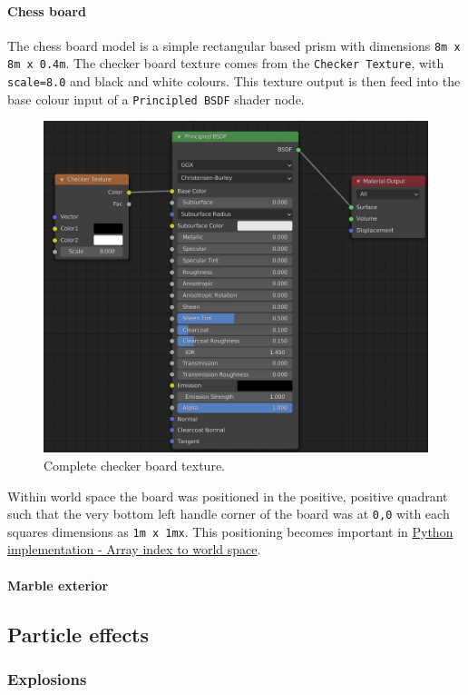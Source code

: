 \documentclass[11pt]{article}
\begin{document}
\paragraph{Chess board}
\label{sec:orgedf1908}
The chess board model is a simple rectangular based prism with dimensions \texttt{8m x
8m x 0.4m}. The checker board texture comes from the \texttt{Checker Texture}, with
\texttt{scale=8.0} and black and white colours. This texture output is then feed into
the base colour input of a \texttt{Principled BSDF} shader node.

\begin{figure}[htbp]
\centering
\includegraphics[width=350pt]{Images/checker texture.png}
\caption{\label{checker-texture}Complete checker board texture.}
\end{figure}

Within world space the board was positioned in the positive, positive quadrant
such that the very bottom left handle corner of the board was at \texttt{0,0}
with each squares dimensions as \texttt{1m x 1mx}. This positioning becomes important
in \hyperref[sec:org83e8bbd]{Python implementation - Array index to world space}.
\paragraph{Marble exterior}
\label{sec:org8f4f098}
\subsection{Particle effects}
\label{sec:org466c359}
\subsubsection{Explosions}
\label{sec:org48b7e8f}
\end{document}
